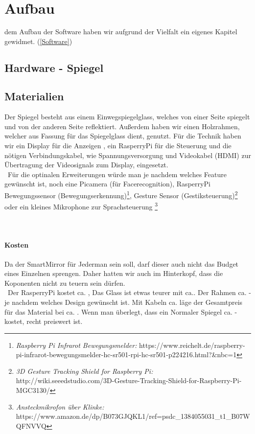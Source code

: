 \section{Aufbau}
dem Aufbau der Software haben wir aufgrund der Vielfalt ein eigenes Kapitel gewidmet. (\ref{Software})
\subsection{Hardware - Spiegel}

\subsection{Materialien}
Der Spiegel besteht aus einem Einwegspiegelglass, welches von einer Seite spiegelt und von der anderen Seite reflektiert. Außerdem haben wir einen Holzrahmen, welcher aus Fassung für das Spiegelglass dient, genutzt. Für die Technik haben wir ein Display für die Anzeigen , ein RasperryPi für die Steuerung und die nötigen Verbindungskabel, wie Spannungsversorgung und Videokabel (HDMI) zur Übertragung der Videosignals zum Display, eingesetzt.\\\
Für die optinalen Erweiterungen würde man je nachdem welches Feature gewünscht ist, noch eine Picamera (für Facerecognition), RasperryPi Bewegungssensor (Bewegungserkennung)\footnote{\textit{ Raspberry Pi Infrarot Bewegungsmelder:} https://www.reichelt.de/raspberry-pi-infrarot-bewegungsmelder-hc-sr501-rpi-hc-sr501-p224216.html?\&nbc=1}, Gesture Sensor (Gestiksteuerung)\footnote{\textit{3D Gesture Tracking Shield for Raspberry Pi:}  http://wiki.seeedstudio.com/3D-Gesture-Tracking-Shield-for-Raspberry-Pi-MGC3130/} oder ein kleines Mikrophone zur Sprachsteuerung \footnote{\textit{Ansteckmikrofon über Klinke:} https://www.amazon.de/dp/B073GJQKL1/ref=psdc\_1384055031\_t1\_B07WQFNVVQ}
\\\\\\
\paragraph{Kosten}
Da der SmartMirror für Jederman sein soll, darf dieser auch nicht das Budget eines Einzelnen sprengen. Daher hatten wir auch im Hinterkopf, dass die Koponenten nicht zu teuern sein dürfen.\\\
Der RasperryPi kostet ca. , Das Glass ist etwas teurer mit ca.. Der Rahmen ca.  -  je nachdem welches Design gewünscht ist. Mit Kabeln ca.  läge der Gesamtpreis für das Material bei ca. . Wenn man überlegt, dass ein Normaler Spiegel ca. - kostet, recht preiswert ist.
